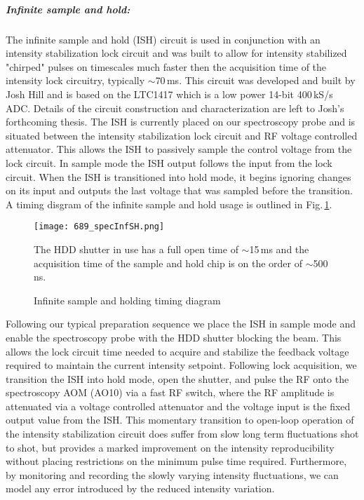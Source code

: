 \subparagraph{Infinite sample and hold:}
The infinite sample and hold (ISH) circuit is used in conjunction with an intensity stabilization lock circuit and was built to allow for intensity stabilized "chirped" pulses on timescales much faster then the acquisition time of the intensity lock circuitry, typically $\sim$70\,ms.
This circuit was developed and built by Josh Hill and is based on the LTC1417 which is a low power 14-bit 400\,kS/s ADC.
Details of the circuit construction and characterization are left to Josh's forthcoming thesis.
The ISH is currently placed on our spectroscopy probe and is situated between the intensity stabilization lock circuit and RF voltage controlled attenuator.
This allows the ISH to passively sample the control voltage from the lock circuit.
In sample mode the ISH output follows the input from the lock circuit.
When the ISH is transitioned into hold mode, it begins ignoring changes on its input and outputs the last voltage that was sampled before the transition.
A timing disgram of the infinite sample and hold usage is outlined in Fig.\,\ref{fig:689specInfSH}.
	\begin{figure}
	\centerline{
		\texttt{[image: 689\_specInfSH.png]}}
		\caption{Infinite sample and holding timing diagram}{The HDD shutter in use has a full open time of $\sim$15\,ms and the acquisition time of the sample and hold chip is on the order of $\sim$500\,ns.}
		 \label{fig:689specInfSH}
	\end{figure}
Following our typical preparation sequence we place the ISH in sample mode and enable the spectroscopy probe with the HDD shutter blocking the beam. 
This allows the lock circuit time needed to acquire and stabilize the feedback voltage required to maintain the current intensity setpoint.
Following lock acquisition, we transition the ISH into hold mode, open the shutter, and pulse the RF onto the spectroscopy AOM (AO10) via a fast RF switch, where the RF amplitude is attenuated via a voltage controlled attenuator and the voltage input is the fixed output value from the ISH.
This momentary transition to open-loop operation of the intensity stabilization circuit does suffer from slow long term fluctuations shot to shot, but provides a marked improvement on the intensity reproducibility without placing restrictions on the minimum pulse time required.
Furthermore, by monitoring and recording the slowly varying intensity fluctuations, we can model any error introduced by the reduced intensity variation.

